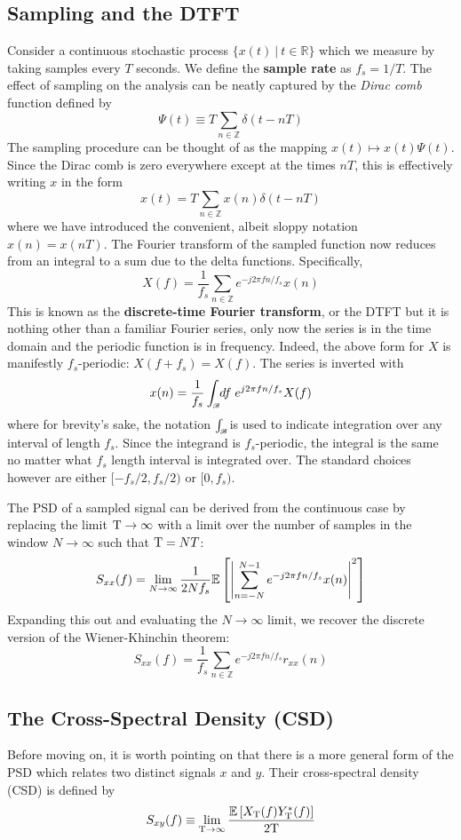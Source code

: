 \documentclass[twocolumn]{gwclass}
\newcommand{\R}{\mathbb{R}}
\newcommand{\Z}{\mathbb{Z}}
\newcommand{\intbw}[1]{\int_{\hspace{-0.1em}\scriptscriptstyle\mathscr{B}}\hspace{-0.25em}}
\begin{document}
\subsection{Sampling and the DTFT}
Consider a continuous stochastic process $\{x(t)\:|\:t\in\R\}$ which we measure by taking samples every $T$ seconds. We define the \textbf{sample rate} as $f_s=1/T$. The effect of sampling on the analysis can be neatly captured by the \emph{Dirac comb} function defined by
$$ \Psi(t) \equiv T\sum_{n\in\mathbb{Z}} \delta(t - nT) $$
The sampling procedure can be thought of as the mapping $x(t)\mapsto x(t)\Psi(t)$. Since the Dirac comb is zero everywhere except at the times $nT$, this is effectively writing $x$ in the form
$$ x(t)= T\sum_{n\in\Z}x(n)\delta(t- nT) $$
where we have introduced the convenient, albeit sloppy notation $x(n)=x(nT)$. The Fourier transform of the sampled function now reduces from an integral to a sum due to the delta functions. Specifically,
$$ X(f) = \frac{1}{f_s}\sum_{n\in\mathbb{Z}}e^{-j2\pi f n/f_s} x(n) $$
This is known as the \textbf{discrete-time Fourier transform}, or the DTFT but it is nothing other than a familiar Fourier series, only now the series is in the time domain and the periodic function is in frequency. Indeed, the above form for $X$ is manifestly $f_s$-periodic: $X(f+f_s)=X(f)$. The series is inverted with
$$ x(n) = \frac{1}{f_s}\intbw{f_s}df\;e^{j2\pi fn/f_s}X(f) $$
where for brevity's sake, the notation $\intbw{1}$ is used to indicate integration over any interval of length $f_s$. Since the integrand is $f_s$-periodic, the integral is the same no matter what $f_s$ length interval is integrated over. The standard choices however are either $[-f_s/2, f_s/2)$ or $[0,f_s)$.

The PSD of a sampled signal can be derived from the continuous case by replacing the limit $\text{\normalfont{T}}\to\infty$ with a limit over the number of samples in the window $N\to\infty$ such that $\text{\normalfont{T}}=NT$:
$$ S_{xx}(f) = \lim_{N\to\infty} \frac{1}{2Nf_s}\mathbb{E}\left[\abs{\sum_{n=-N}^{N-1}e^{-j2\pi fn/f_s}x(n)  }^2\right] $$
Expanding this out and evaluating the $N\to\infty$ limit, we recover the discrete version of the Wiener-Khinchin theorem:
$$ S_{xx}(f) = \frac{1}{f_s} \sum_{n\in\Z} e^{-j2\pi fn/f_s}r_{xx}(n)  $$

\subsection{The Cross-Spectral Density (CSD)}
Before moving on, it is worth pointing on that there is a more general form of the PSD which relates two distinct signals $x$ and $y$. Their cross-spectral density (CSD) is defined by
$$ S_{xy}(f) \equiv \lim_{\text{\normalfont{T}}\to\infty}\frac{\mathbb{E}\left[X_{\text{\normalfont{T}}}(f)Y_{\text{\normalfont{T}}}^*(f)\right]}{2\text{\normalfont{T}}} $$
\end{document}
